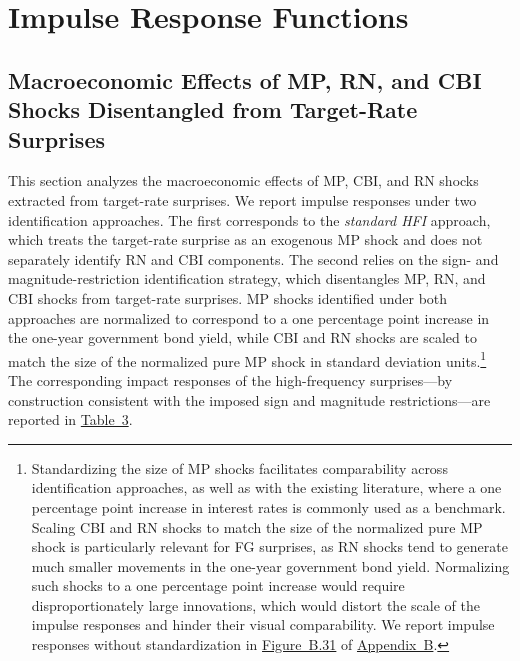 \documentclass[\latexroot/\projectname]{subfiles}
\begin{document}
\section{Impulse Response Functions}
\hypertarget{Section 5}{}

\subsection{Macroeconomic Effects of MP, RN, and CBI Shocks Disentangled from Target-Rate Surprises}

This section analyzes the macroeconomic effects of MP, CBI, and RN shocks extracted from target-rate surprises. We report impulse responses under two identification approaches. The first corresponds to the \emph{standard HFI} approach, which treats the target-rate surprise as an exogenous MP shock and does not separately identify RN and CBI components. The second relies on the sign- and magnitude-restriction identification strategy, which disentangles MP, RN, and CBI shocks from target-rate surprises. MP shocks identified under both approaches are normalized to correspond to a one percentage point increase in the one-year government bond yield, while CBI and RN shocks are scaled to match the size of the normalized pure MP shock in standard deviation units.\footnote{Standardizing the size of MP shocks facilitates comparability across identification approaches, as well as with the existing literature, where a one percentage point increase in interest rates is commonly used as a benchmark. Scaling CBI and RN shocks to match the size of the normalized pure MP shock is particularly relevant for FG surprises, as RN shocks tend to generate much smaller movements in the one-year government bond yield. Normalizing such shocks to a one percentage point increase would require disproportionately large innovations, which would distort the scale of the impulse responses and hinder their visual comparability. We report impulse responses without standardization in \hyperlink{Figure B.31}{Figure~B.31} of \hyperlink{Appendix B}{Appendix~B}.} The corresponding impact responses of the high-frequency surprises---by construction consistent with the imposed sign and magnitude restrictions---are reported in \hyperlink{Table 3}{Table~3}.


\end{document}

